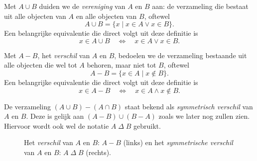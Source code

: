 Met $A\cup B$ duiden we de \textit{vereniging} van $A$ en $B$ aan: de verzameling die bestaat uit alle objecten van $A$ en alle objecten van $B$, oftewel
$$A\cup B=\{x\;|\; x\in A\lor x\in B\}.$$
Een belangrijke equivalentie die direct volgt uit deze definitie is
$$x\in A\cup B\quad\Leftrightarrow\quad x\in A\lor x\in B.$$

Met $A-B$, het \textit{verschil} van $A$ en $B$, bedoelen we de verzameling bestaande uit alle objecten die wel tot $A$ behoren, maar niet tot $B$, oftewel
$$A-B=\{x\in A\;|\;x\not\in B\}.$$
Een belangrijke equivalentie die direct volgt uit deze definitie is
$$x\in A-B\quad\Leftrightarrow\quad x\in A\land x\not\in B.$$

De verzameling $(A\cup B)-(A\cap B)$ staat bekend als \textit{symmetrisch verschil} van $A$ en $B$. Deze is gelijk aan $(A-B)\cup(B-A)$ zoals we later nog zullen zien. Hiervoor wordt ook wel de notatie $A\;\Delta\;B$ gebruikt.
\begin{figure}[ht]
    \centering
    \hspace{1cm} 
    \caption{Het \textit{verschil} van $A$ en $B$: $A-B$ (links) en het \textit{symmetrische verschil} van $A$ en $B$: $A\;\Delta\; B$ (rechts).}
    \label{fig:diff:symdif}
\end{figure} 

